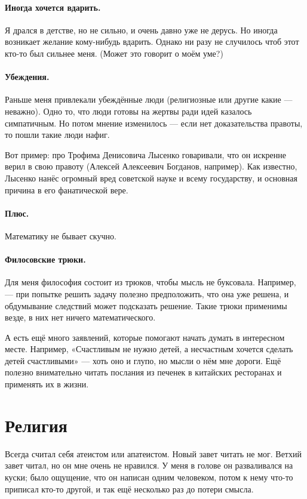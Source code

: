 \documentclass{book}
\begin{document}
\paragraph{Иногда хочется вдарить.}
Я дрался в детстве, но не сильно, и очень давно уже не дерусь.
Но иногда возникает желание кому-нибудь вдарить.
Однако ни разу не случилось чтоб этот кто-то был сильнее меня.
(Может это говорит о моём уме?)

\paragraph{Убеждения.}
Раньше меня привлекали убеждённые люди (религиозные или другие какие --- неважно).
Одно то, что люди готовы на жертвы ради идей казалось симпатичным.
Но потом мнение изменилось --- если нет доказательства правоты, то пошли такие люди нафиг.

Вот пример: про Трофима Денисовича Лысенко говаривали, что он искренне верил в свою правоту (Алексей Алексеевич Богданов, например).
Как известно, Лысенко нанёс огромный вред советской науке и всему государству, и основная причина в его фанатической вере.

\paragraph{Плюс.}
Математику не бывает скучно.

\paragraph{Филосовские трюки.}
Для меня философия состоит из трюков, чтобы мысль не буксовала.
Например,  --- при попытке решить задачу полезно предположить, что она уже решена, и обдумывание следствий может подсказать решение.
Такие трюки применимы везде, в них нет ничего математического.

А есть ещё много заявлений, которые помогают начать думать в интересном месте.
Например, «Счастливым не нужно детей, а несчастным хочется сделать детей счастливыми» --- хоть оно и глупо, но мысли о нём мне дороги.
Ещё полезно внимательно читать послания из печенек в китайских ресторанах и применять их в жизни.

\section*{Религия}

Всегда считал себя атеистом или апатеистом.
Новый завет читать не мог.
Ветхий завет читал, но он мне очень не нравился.
У меня в голове он разваливался на куски; было ощущение, что он написан одним человеком, потом к нему что-то приписал кто-то другой, и так ещё несколько раз до потери смысла.
\end{document}
